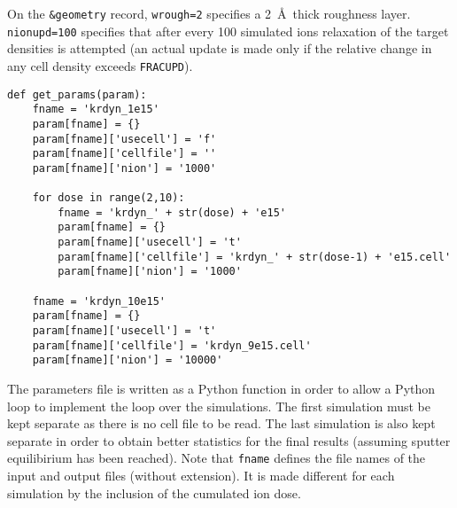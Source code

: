 On the \texttt{\&geometry} record, \texttt{wrough=2} specifies a 2~\AA\ thick
roughness layer. \texttt{nionupd=100} specifies that after every 100 simulated
ions relaxation of the target densities is attempted (an actual update is made
only if the relative change in any cell density exceeds \texttt{FRACUPD}).

\begin{verbatim}
def get_params(param):
    fname = 'krdyn_1e15'
    param[fname] = {}
    param[fname]['usecell'] = 'f'
    param[fname]['cellfile'] = ''
    param[fname]['nion'] = '1000'
    
    for dose in range(2,10):
        fname = 'krdyn_' + str(dose) + 'e15'
        param[fname] = {}
        param[fname]['usecell'] = 't'
        param[fname]['cellfile'] = 'krdyn_' + str(dose-1) + 'e15.cell'
        param[fname]['nion'] = '1000'
    
    fname = 'krdyn_10e15'
    param[fname] = {}
    param[fname]['usecell'] = 't'
    param[fname]['cellfile'] = 'krdyn_9e15.cell'
    param[fname]['nion'] = '10000'
\end{verbatim}

The parameters file is written as a Python function in order to allow a Python
loop to implement the loop over the simulations. The first simulation must be
kept separate as there is no cell file to be read. The last simulation is also
kept separate in order to obtain better statistics for the final results
(assuming sputter equilibirium has been reached). Note that \texttt{fname}
defines the file names of the input and output files (without extension). It is
made different for each simulation by the inclusion of the cumulated ion dose.
